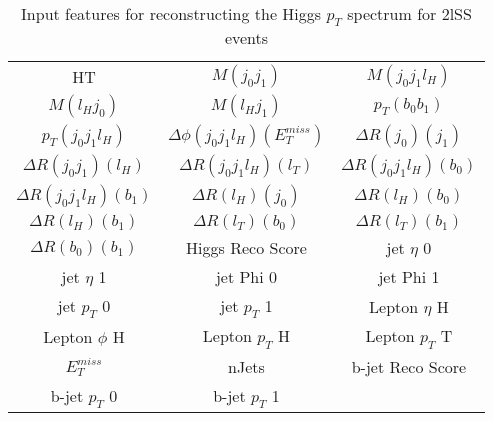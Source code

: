 \begin{table}[H]
  \begin{center}
  \begin{tabular}{ccc}
    \hline\hline
    HT & $M(j_0j_1)$ & $M(j_0j_1l_{H})$ \\
    $M(l_{H}j_0)$ & $M(l_{H}j_1)$ & $p_T(b_0b_1)$ \\
     $p_T(j_0j_1l_{H})$ & $\Delta\phi(j_0j_1l_{H})(E_T^{miss})$ & $\Delta R(j_0)(j_1)$ \\
    $\Delta R(j_0j_1)(l_{H})$ & $\Delta R(j_0j_1l_{H})(l_{T})$ & $\Delta R(j_0j_1l_{H})(b_0)$ \\
    $\Delta R(j_0j_1l_{H})(b_1)$ & $\Delta R(l_{H})(j_0)$ & $\Delta R(l_{H})(b_0)$ \\
    $\Delta R(l_{H})(b_1)$ & $\Delta R(l_{T})(b_0)$ & $\Delta R(l_{T})(b_1)$ \\
    $\Delta R(b_0)(b_1)$ & Higgs Reco Score & jet  $\eta$ 0 \\
    jet  $\eta$ 1 & jet Phi 0 & jet Phi 1 \\
    jet  $p_T$ 0 & jet  $p_T$ 1 & Lepton  $\eta$ H \\
    Lepton $\phi$ H & Lepton  $p_T$ H & Lepton  $p_T$ T \\
    $E_T^{miss}$ & nJets & b-jet Reco Score \\
    b-jet $p_T$ 0 & b-jet $p_T$ 1 & \\
    \hline
  \end{tabular}
  \end{center}
  \caption{Input features for reconstructing the Higgs $p_T$ spectrum for 2lSS events}
  \label{tab:pt2lSSfeatures}
\end{table}
